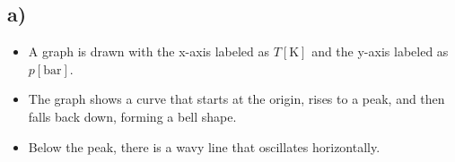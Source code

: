 

\subsection*{a)}
\begin{itemize}
    \item A graph is drawn with the x-axis labeled as $T[\text{K}]$ and the y-axis labeled as $p[\text{bar}]$.
    \item The graph shows a curve that starts at the origin, rises to a peak, and then falls back down, forming a bell shape.
    \item Below the peak, there is a wavy line that oscillates horizontally.
\end{itemize}